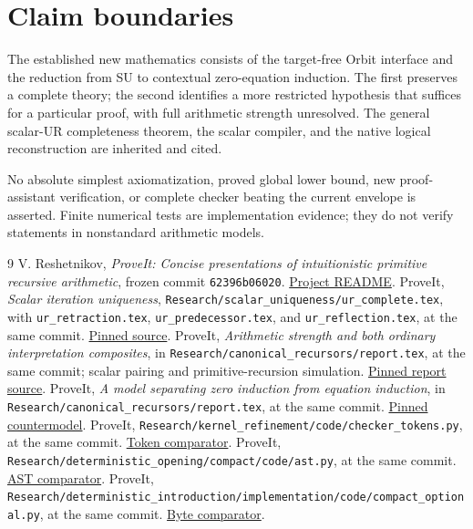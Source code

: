 \documentclass[11pt]{article}
\theoremstyle{definition}
\newcommand{\file}[1]{{\small\nolinkurl{#1}}}
\newcommand{\srcbase}{https://github.com/VladimirReshetnikov/ProveIt/blob/62396b06020f794fa6dc01b4025a6a5db9d4d28a/Logic/PrimitiveRecursiveArithmetic/ConciseIPRA/}
\begin{document}
\section{Claim boundaries}

The established new mathematics consists of the target-free Orbit interface and the reduction from SU to contextual zero-equation induction. The first preserves a complete theory; the second identifies a more restricted hypothesis that suffices for a particular proof, with full arithmetic strength unresolved. The general scalar-UR completeness theorem, the scalar compiler, and the native logical reconstruction are inherited and cited.

No absolute simplest axiomatization, proved global lower bound, new proof-assistant verification, or complete checker beating the current envelope is asserted. Finite numerical tests are implementation evidence; they do not verify statements in nonstandard arithmetic models.

\begin{thebibliography}{9}
 V. Reshetnikov, \emph{ProveIt: Concise presentations of intuitionistic primitive recursive arithmetic}, frozen commit \texttt{62396b06020}. \href{\srcbase README.md}{Project README}.
 ProveIt, \emph{Scalar iteration uniqueness}, \file{Research/scalar_uniqueness/ur_complete.tex}, with \file{ur_retraction.tex}, \file{ur_predecessor.tex}, and \file{ur_reflection.tex}, at the same commit. \href{\srcbase Research/scalar_uniqueness/ur_complete.tex}{Pinned source}.
 ProveIt, \emph{Arithmetic strength and both ordinary interpretation composites}, in \file{Research/canonical_recursors/report.tex}, at the same commit; scalar pairing and primitive-recursion simulation. \href{\srcbase Research/canonical_recursors/report.tex}{Pinned report source}.
 ProveIt, \emph{A model separating zero induction from equation induction}, in \file{Research/canonical_recursors/report.tex}, at the same commit. \href{\srcbase Research/canonical_recursors/report.tex}{Pinned countermodel}.
 ProveIt, \file{Research/kernel_refinement/code/checker_tokens.py}, at the same commit. \href{\srcbase Research/kernel_refinement/code/checker_tokens.py}{Token comparator}.
 ProveIt, \file{Research/deterministic_opening/compact/code/ast.py}, at the same commit. \href{\srcbase Research/deterministic_opening/compact/code/ast.py}{AST comparator}.
 ProveIt, \file{Research/deterministic_introduction/implementation/code/compact_optional.py}, at the same commit. \href{\srcbase Research/deterministic_introduction/implementation/code/compact_optional.py}{Byte comparator}.
\end{thebibliography}
\end{document}
